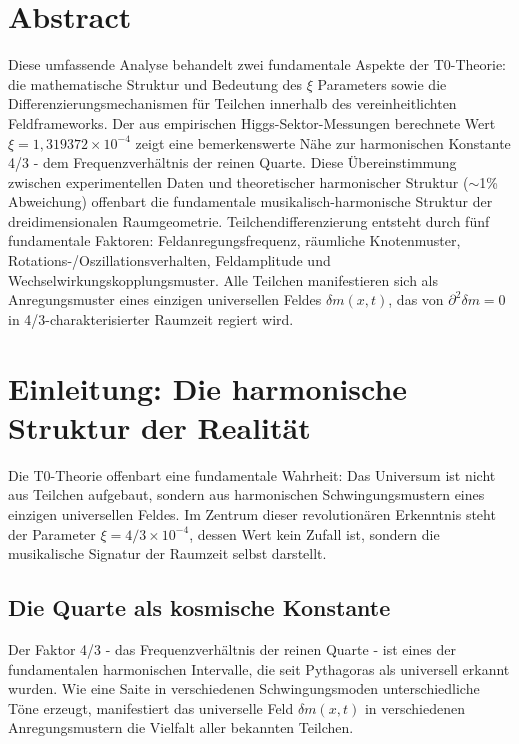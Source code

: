\section*{Abstract}
		Diese umfassende Analyse behandelt zwei fundamentale Aspekte der T0-Theorie: die mathematische Struktur und Bedeutung des $\xi$ Parameters sowie die Differenzierungsmechanismen für Teilchen innerhalb des vereinheitlichten Feldframeworks. Der aus empirischen Higgs-Sektor-Messungen berechnete Wert $\xi = 1{,}319372 \times 10^{-4}$ zeigt eine bemerkenswerte Nähe zur harmonischen Konstante 4/3 - dem Frequenzverhältnis der reinen Quarte. Diese Übereinstimmung zwischen experimentellen Daten und theoretischer harmonischer Struktur ($\sim$1\% Abweichung) offenbart die fundamentale musikalisch-harmonische Struktur der dreidimensionalen Raumgeometrie. Teilchendifferenzierung entsteht durch fünf fundamentale Faktoren: Feldanregungsfrequenz, räumliche Knotenmuster, Rotations-/Oszillationsverhalten, Feldamplitude und Wechselwirkungskopplungsmuster. Alle Teilchen manifestieren sich als Anregungsmuster eines einzigen universellen Feldes $\delta m(x,t)$, das von $\partial^2\delta m = 0$ in 4/3-charakterisierter Raumzeit regiert wird.

	
	
	\section{Einleitung: Die harmonische Struktur der Realität}
	\label{sec:einleitung}
	
	Die T0-Theorie offenbart eine fundamentale Wahrheit: Das Universum ist nicht aus Teilchen aufgebaut, sondern aus harmonischen Schwingungsmustern eines einzigen universellen Feldes. Im Zentrum dieser revolutionären Erkenntnis steht der Parameter $\xi = 4/3 \times 10^{-4}$, dessen Wert kein Zufall ist, sondern die musikalische Signatur der Raumzeit selbst darstellt.
	
	\subsection{Die Quarte als kosmische Konstante}
	\label{subsec:quarte-konstante}
	
	Der Faktor 4/3 - das Frequenzverhältnis der reinen Quarte - ist eines der fundamentalen harmonischen Intervalle, die seit Pythagoras als universell erkannt wurden. Wie eine Saite in verschiedenen Schwingungsmoden unterschiedliche Töne erzeugt, manifestiert das universelle Feld $\delta m(x,t)$ in verschiedenen Anregungsmustern die Vielfalt aller bekannten Teilchen.
	
